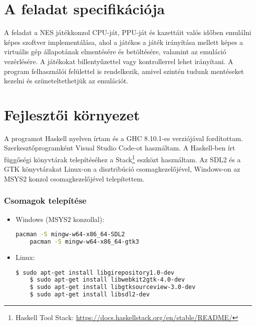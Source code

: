 \section{A feladat specifikációja}

A feladat a NES játékkonzol CPU-ját, PPU-ját és kazettáit valós időben emulálni képes szoftver implementálása, ahol a játékos a játék irányítása mellett képes a virtuális gép állapotának elmentésére és betöltésére, valamint az emuláció vezérlésére. A játékokat billentyűzettel vagy kontrollerrel lehet irányítani. A program felhasználói felülettel is rendelkezik, amivel szintén tudunk mentéseket kezelni és szüneteltethetjük az emulációt.

\section{Fejlesztői környezet}

A programot Haskell nyelven írtam és a GHC 8.10.1-es verziójával fordítottam. Szerkesztőprogramként Visual Studio Code-ot használtam. A Haskell-ben írt függőségi könyvtárak telepítéséhez a Stack\footnote{Haskell Tool Stack: \url{https://docs.haskellstack.org/en/stable/README/}} eszközt használtam.
Az SDL2 és a GTK könyvtárakat Linux-on a disztribúció csomagkezelőjével, Windows-on az MSYS2 konzol csomagkezelőjével telepítettem. 
\clearpage
\subsubsection{Csomagok telepítése}
\begin{itemize}
	\item Windows (MSYS2 konzollal):
	\begin{lstlisting}[language=bash]
	pacman -S mingw-w64-x86_64-SDL2
	pacman -S mingw-w64-x86_64-gtk3
	\end{lstlisting}
	\item Linux:
	\begin{lstlisting}[language=bash]
	$ sudo apt-get install libgirepository1.0-dev
	$ sudo apt-get install libwebkit2gtk-4.0-dev
	$ sudo apt-get install libgtksourceview-3.0-dev
	$ sudo apt-get install libsdl2-dev
	\end{lstlisting}
\end{itemize}

